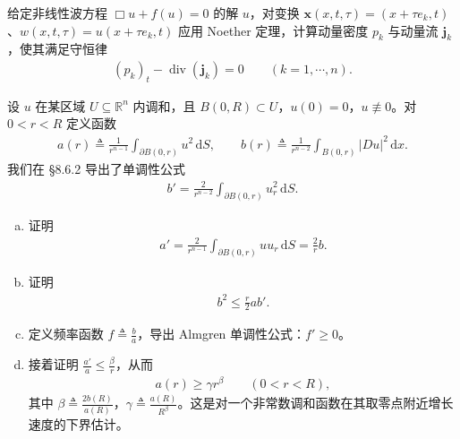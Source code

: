 \documentclass[../../main.tex]{subfiles}
\begin{document}
\begin{exercise}[动量守恒]\label{exercise:ch08-7-19}给定非线性波方程 $\Box u+f(u)=0$ 的解 $u$，对变换 $\mathbf{x}(x,t,\tau)=(x+\tau e_k,t)$、$w(x,t,\tau)=u(x+\tau e_k,t)$ 应用 Noether 定理，计算动量密度 $p_k$ 与动量流 $\mathbf{j}_k$，使其满足守恒律
\begin{align*}
(p_k)_t-\operatorname{div}(\mathbf{j}_k)=0\qquad (k=1,\cdots,n).
\end{align*}
\end{exercise}

\begin{exercise}\label{exercise:ch08-7-20}
设 $u$ 在某区域 $U\subseteq\mathbb{R}^n$ 内调和，且 $B(0,R)\subset U$，$u(0)=0$，$u\not\equiv 0$。对 $0<r<R$ 定义函数
\begin{align*}
a(r)\triangleq\frac1{r^{n-1}}\int_{\partial B(0,r)}u^2\,\mathrm{d}S,\qquad b(r)\triangleq\frac1{r^{n-2}}\int_{B(0,r)}|Du|^2\,\mathrm{d}x.
\end{align*}
我们在 \S8.6.2 导出了单调性公式
\begin{align*}
b'=\frac{2}{r^{n-2}}\int_{\partial B(0,r)}u_r^2\,\mathrm{d}S.
\end{align*}
\begin{enumerate}[(a)]
\item 证明
\begin{align*}
a'=\frac{2}{r^{n-1}}\int_{\partial B(0,r)}uu_r\,\mathrm{d}S=\frac2r b.
\end{align*}
\item 证明
\begin{align*}
b^2\leqslant\frac{r}{2}ab'.
\end{align*}
\item 定义频率函数 $f\triangleq\frac b a$，导出 Almgren 单调性公式：$f'\geqslant 0$。
\item 接着证明 $\frac{a'}a\leqslant\frac\beta r$，从而
\begin{align*}
a(r)\geqslant\gamma r^\beta\qquad (0<r<R),
\end{align*}
其中 $\beta\triangleq\frac{2b(R)}{a(R)}$，$\gamma\triangleq\frac{a(R)}{R^\beta}$。这是对一个非常数调和函数在其取零点附近增长速度的下界估计。
\end{enumerate}
\end{exercise}
\end{document}
